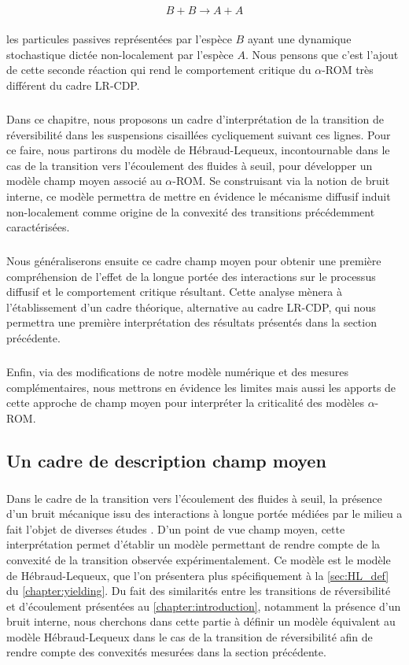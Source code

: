 \begin{equation}
	B +B \xrightarrow[]{} A + A
	\label{eq:meca_diff}
\end{equation}

\noindent les particules passives représentées par l'espèce $B$ ayant une dynamique stochastique dictée non-localement par l'espèce $A$. Nous pensons que c'est l'ajout de cette seconde réaction qui rend le comportement critique du $\alpha$-ROM très différent du cadre LR-CDP.

\subparagraph{}Dans ce chapitre, nous proposons un cadre d'interprétation de la transition de réversibilité dans les suspensions cisaillées cycliquement suivant ces lignes. Pour ce faire, nous partirons du modèle de Hébraud-Lequeux, incontournable dans le cas de la transition vers l'écoulement des fluides à seuil, pour développer un modèle champ moyen associé au $\alpha$-ROM. Se construisant via la notion de bruit interne, ce modèle permettra de mettre en évidence le mécanisme diffusif induit non-localement comme origine de la convexité des transitions précédemment caractérisées.

\subparagraph{}Nous généraliserons ensuite ce cadre champ moyen pour obtenir une première compréhension de  l'effet de la longue portée des interactions sur le processus diffusif et le comportement critique résultant. Cette analyse mènera à l'établissement d'un cadre théorique, alternative au cadre LR-CDP, qui nous permettra une première interprétation des résultats présentés dans la section précédente. 

\subparagraph{}Enfin, via des modifications de notre modèle numérique et des mesures complémentaires, nous mettrons en évidence les limites mais aussi les apports de cette approche de champ moyen pour interpréter la criticalité des modèles $\alpha$-ROM.

\subsection{Un cadre de description champ moyen}

\subparagraph{}Dans le cadre de la transition vers l'écoulement des fluides à seuil, la présence d'un bruit mécanique issu des interactions à longue portée médiées par le milieu a fait l'objet de diverses études \cite{lin_mean-field_2016, ferrero_criticality_2019}. D'un point de vue champ moyen, cette interprétation permet d'établir un modèle permettant de rendre compte de la convexité de la transition observée expérimentalement. Ce modèle est le modèle de Hébraud-Lequeux\cite{hebraud_mode-coupling_1998}, que l'on présentera plus spécifiquement à la \autoref{sec:HL_def} du \autoref{chapter:yielding}. Du fait des similarités entre les transitions de réversibilité et d'écoulement présentées au \autoref{chapter:introduction}, notamment la présence d'un bruit interne, nous cherchons dans cette partie à définir un modèle équivalent au modèle Hébraud-Lequeux dans le cas de la transition de réversibilité afin de rendre compte des convexités mesurées dans la section précédente.

